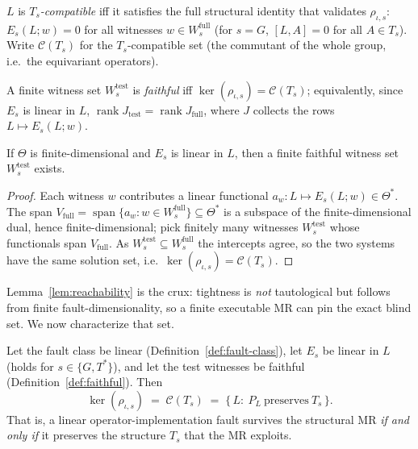 \begin{definition}
\label{def:compatible}
$L$ is \emph{$T_s$-compatible} iff it satisfies the full structural identity that
validates $\rho_{\iota,s}$: $E_s(L;w)=0$ for all witnesses $w\in W^{\mathrm{full}}_s$
(for $s=G$, $[L,A]=0$ for all $A\in T_s$). Write $\mathcal{C}(T_s)$ for the
$T_s$-compatible set (the commutant of the whole group, i.e.\ the equivariant
operators).
\end{definition}

\begin{definition}[Faithfulness]
\label{def:faithful}
A finite witness set $W^{\mathrm{test}}_s$ is \emph{faithful} iff
$\ker(\rho_{\iota,s})=\mathcal{C}(T_s)$; equivalently, since $E_s$ is linear in $L$,
$\operatorname{rank}J_{\mathrm{test}}=\operatorname{rank}J_{\mathrm{full}}$, where $J$ collects the
rows $L\mapsto E_s(L;w)$.
\end{definition}

\begin{lemma}
\label{lem:reachability}
If $\Theta$ is finite-dimensional and $E_s$ is linear in $L$, then a finite
faithful witness set $W^{\mathrm{test}}_s$ exists.
\end{lemma}

\begin{proof}
Each witness $w$ contributes a linear functional $a_w:L\mapsto E_s(L;w)\in\Theta^{*}$.
The span $V_{\mathrm{full}}=\operatorname{span}\{a_w:w\in W^{\mathrm{full}}_s\}\subseteq\Theta^{*}$ is a
subspace of the finite-dimensional dual, hence finite-dimensional; pick finitely
many witnesses $W^{\mathrm{test}}_s$ whose functionals span $V_{\mathrm{full}}$. As
$W^{\mathrm{test}}_s\subseteq W^{\mathrm{full}}_s$ the intercepts agree, so the two systems
have the same solution set, i.e.\ $\ker(\rho_{\iota,s})=\mathcal{C}(T_s)$.
\end{proof}

Lemma~\ref{lem:reachability} is the crux: tightness is \emph{not} tautological but
follows from finite fault-dimensionality, so a finite executable MR can pin the
exact blind set. We now characterize that set.

\begin{theorem}
\label{thm:ibt}
Let the fault class be linear (Definition~\ref{def:fault-class}), let $E_s$ be
linear in $L$ (holds for $s\in\{G,T^{*}\}$), and let the test witnesses be faithful
(Definition~\ref{def:faithful}). Then
\[
\ker(\rho_{\iota,s})\;=\;\mathcal{C}(T_s)\;=\;\{\,L:\ P_L\ \text{preserves}\ T_s\,\}.
\]
That is, a linear operator-implementation fault survives the structural MR
\emph{if and only if} it preserves the structure $T_s$ that the MR exploits.
\end{theorem}

